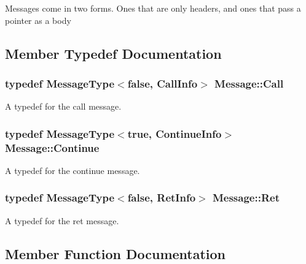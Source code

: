 Messages come in two forms. Ones that are only headers, and ones that pass a pointer as a body 

\subsection{Member Typedef Documentation}
\subsubsection[{\texorpdfstring{Call}{Call}}]{\setlength{\rightskip}{0pt plus 5cm}typedef {\bf Message\+Type}$<$false, {\bf Call\+Info}$>$ {\bf Message\+::\+Call}}\hypertarget{class_message_a0fd0ed431cb0d672045d09368a5d2126}{}\label{class_message_a0fd0ed431cb0d672045d09368a5d2126}


A typedef for the call message. 

\subsubsection[{\texorpdfstring{Continue}{Continue}}]{\setlength{\rightskip}{0pt plus 5cm}typedef {\bf Message\+Type}$<$true, {\bf Continue\+Info}$>$ {\bf Message\+::\+Continue}}\hypertarget{class_message_a04de61b84a209cdf372b6f53f3adf7c4}{}\label{class_message_a04de61b84a209cdf372b6f53f3adf7c4}


A typedef for the continue message. 

\subsubsection[{\texorpdfstring{Ret}{Ret}}]{\setlength{\rightskip}{0pt plus 5cm}typedef {\bf Message\+Type}$<$false, {\bf Ret\+Info}$>$ {\bf Message\+::\+Ret}}\hypertarget{class_message_a146628035f5a0723cb04f7a328858e34}{}\label{class_message_a146628035f5a0723cb04f7a328858e34}


A typedef for the ret message. 



\subsection{Member Function Documentation}
